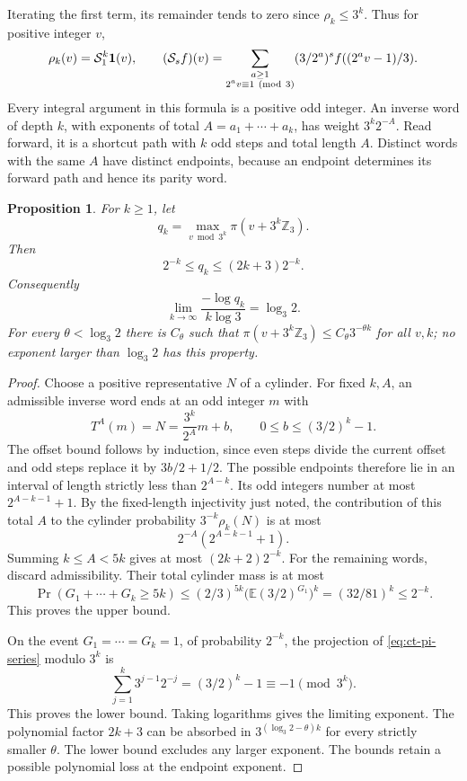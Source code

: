 \documentclass[11pt,a4paper]{article}
\newtheorem{proposition}[theorem]{Proposition}
\begin{document}
Iterating the first term, its remainder tends to zero since
\(\rho_k\le3^k\). Thus for positive integer \(v\),
\begin{equation}\label{eq:ct-odd-blocks}
 \rho_k(v)=\mathcal S_1^k\mathbf1(v),\qquad
 (\mathcal S_s f)(v)
 =\sum_{\substack{a\ge1\\2^av\equiv1\ ({\rm mod}\ 3)}}
       (3/2^a)^s f((2^av-1)/3).
\end{equation}
Every integral argument in this formula is a positive odd integer.
An inverse word of depth \(k\), with exponents of total
\(A=a_1+\cdots+a_k\), has weight \(3^k2^{-A}\).
Read forward, it is a shortcut path with \(k\) odd steps and
total length \(A\). Distinct words with the same \(A\) have
distinct endpoints, because an endpoint determines its forward
path and hence its parity word.

\begin{proposition}\label{prop:ct-cylinder-max}
For \(k\ge1\), let
\[
 q_k=\max_{v\bmod3^k}\pi(v+3^k\mathbb Z_3).
\]
Then
\begin{equation}\label{eq:ct-cylinder-max}
 2^{-k}\le q_k\le(2k+3)2^{-k}.
\end{equation}
Consequently
\[
 \lim_{k\to\infty}\frac{-\log q_k}{k\log3}=\log_3 2.
\]
For every \(\theta<\log_3 2\) there is \(C_\theta\) such that
\(\pi(v+3^k\mathbb Z_3)\le C_\theta3^{-\theta k}\)
for all \(v,k\); no exponent larger than \(\log_3 2\) has
this property.
\end{proposition}
\begin{proof}
Choose a positive representative \(N\) of a cylinder. For fixed
\(k,A\), an admissible inverse word ends at an odd integer \(m\)
with
\[
 T^A(m)=N=\frac{3^k}{2^A}m+b,\qquad
 0\le b\le(3/2)^k-1.
\]
The offset bound follows by induction, since even steps divide
the current offset and odd steps replace it by \(3b/2+1/2\).
The possible endpoints therefore lie in an interval of length
strictly less than \(2^{A-k}\). Its odd integers number at most
\(2^{A-k-1}+1\). By the fixed-length injectivity just noted,
the contribution of this total \(A\) to the cylinder probability
\(3^{-k}\rho_k(N)\) is at most
\[
 2^{-A}(2^{A-k-1}+1).
\]
Summing \(k\le A<5k\) gives at most
\((2k+2)2^{-k}\). For the remaining words, discard admissibility.
Their total cylinder mass is at most
\[
 \Pr(G_1+\cdots+G_k\ge5k)
 \le(2/3)^{5k}\bigl(\mathbb E(3/2)^{G_1}\bigr)^k
 =(32/81)^k\le2^{-k}.
\]
This proves the upper bound.

On the event \(G_1=\cdots=G_k=1\), of probability \(2^{-k}\),
the projection of \eqref{eq:ct-pi-series} modulo \(3^k\) is
\[
 \sum_{j=1}^k3^{j-1}2^{-j}=(3/2)^k-1\equiv-1\pmod{3^k}.
\]
This proves the lower bound. Taking logarithms gives the limiting
exponent. The polynomial factor \(2k+3\) can be absorbed in
\(3^{(\log_3 2-\theta)k}\) for every strictly smaller \(\theta\).
The lower bound excludes any larger exponent. The bounds retain
a possible polynomial loss at the endpoint exponent.
\end{proof}
\end{document}
